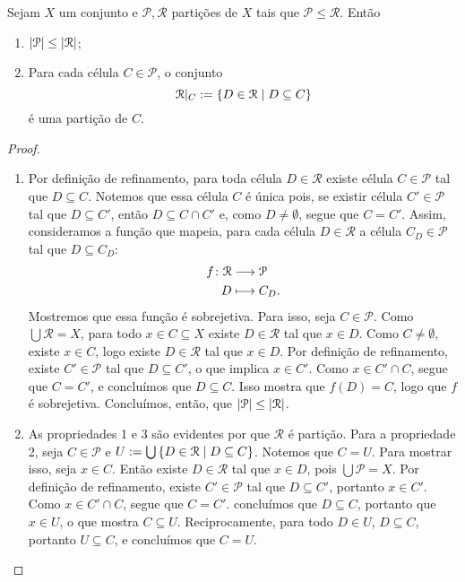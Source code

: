 \begin{proposition}
Sejam $X$ um conjunto e $\mathcal P,\mathcal R$ partições de $X$ tais que $\mathcal P \leq \mathcal R$. Então
	\begin{enumerate}
	\item $\left\lvert{\mathcal P}\right\rvert \leq \left\lvert{\mathcal R}\right\rvert$;
	\item Para cada célula $C \in \mathcal P$, o conjunto
		\begin{equation*}
		\mathcal R|_C := \left\{{D \in \mathcal R}\;\middle\vert\;{D \subseteq C}\right\}
		\end{equation*}
é uma partição de $C$.
	\end{enumerate}
\end{proposition}
\begin{proof}
	\begin{enumerate}
	\item Por definição de refinamento, para toda célula $D \in \mathcal R$ existe célula $C \in \mathcal P$ tal que $D \subseteq C$. Notemos que essa célula $C$ é única pois, se existir célula $C' \in \mathcal P$ tal que $D \subseteq C'$, então $D \subseteq C \cap C'$ e, como $D \neq \emptyset$, segue que $C =C'$. Assim, consideramos a função que mapeia, para cada célula $D \in \mathcal R$ a célula $C_D \in \mathcal P$ tal que $D \subseteq C_D$:
	\begin{align*}
	{f}\colon {\mathcal R} &\longrightarrow {\mathcal P} \\{D} &\longmapsto C_D.
	\end{align*}
Mostremos que essa função é sobrejetiva. Para isso, seja $C \in \mathcal P$. Como $\bigcup \mathcal R = X$, para todo $x \in C \subseteq X$ existe $D \in \mathcal R$ tal que $x \in D$. Como $C \neq \emptyset$, existe $x \in C$, logo existe $D \in \mathcal R$ tal que $x \in D$. Por definição de refinamento, existe $C' \in \mathcal P$ tal que $D \subseteq C'$, o que implica $x \in C'$. Como $x \in C' \cap C$, segue que $C=C'$, e concluímos que $D \subseteq C$. Isso mostra que $f(D)=C$, logo que $f$ é sobrejetiva. Concluímos, então, que $\left\lvert{\mathcal P}\right\rvert \leq \left\lvert{\mathcal R}\right\rvert$.
	
	\item As propriedades 1 e 3 são evidentes por que $\mathcal R$ é partição. Para a propriedade 2, seja $C \in \mathcal P$ e $U := \bigcup \left\{{D \in \mathcal R}\;\middle\vert\;{D \subseteq C}\right\}$. Notemos que $C=U$. Para mostrar isso, seja $x \in C$. Então existe $D \in \mathcal R$ tal que $x \in D$, pois $\bigcup \mathcal P=X$. Por definição de refinamento, existe $C' \in \mathcal P$ tal que $D \subseteq C'$, portanto $x \in C'$. Como $x \in C' \cap C$, segue que $C=C'$. concluímos que $D \subseteq C$, portanto que $x \in U$, o que mostra $C \subseteq U$. Reciprocamente, para todo $D \in U$, $D \subseteq C$, portanto $U \subseteq C$, e concluímos que $C=U$.
	\end{enumerate}
\end{proof}

